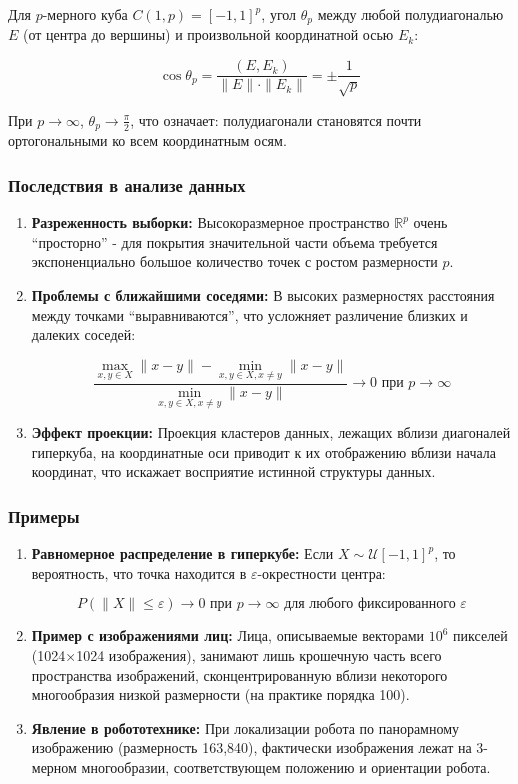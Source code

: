 \documentclass[a4paper,12pt]{article}
\begin{document}
Для $p$-мерного куба $C(1, p) = [-1, 1]^p$, угол $\theta_p$ между любой полудиагональю $E$ (от центра до вершины) и произвольной координатной осью $E_k$:
   
$$\cos\theta_p = \frac{(E, E_k)}{\|E\| \cdot \|E_k\|} = \pm\frac{1}{\sqrt{p}}$$
   
При $p \to \infty$, $\theta_p \to \frac{\pi}{2}$, что означает: полудиагонали становятся почти ортогональными ко всем координатным осям.

\subsubsection{Последствия в анализе данных}

\begin{enumerate}
    \item \textbf{Разреженность выборки:}
    Высокоразмерное пространство $\mathbb{R}^p$ очень ``просторно'' - для покрытия значительной части объема требуется экспоненциально большое количество точек с ростом размерности $p$.

    \item \textbf{Проблемы с ближайшими соседями:}
    В высоких размерностях расстояния между точками ``выравниваются'', что усложняет различение близких и далеких соседей:
    
    $$\frac{\max_{x,y \in X} \|x-y\| - \min_{x,y \in X, x \neq y} \|x-y\|}{\min_{x,y \in X, x \neq y} \|x-y\|} \to 0 \text{ при } p \to \infty$$

    \item \textbf{Эффект проекции:}
    Проекция кластеров данных, лежащих вблизи диагоналей гиперкуба, на координатные оси приводит к их отображению вблизи начала координат, что искажает восприятие истинной структуры данных.
\end{enumerate}

\subsubsection{Примеры}

\begin{enumerate}
    \item \textbf{Равномерное распределение в гиперкубе:}
    Если $X \sim \mathcal{U}[-1,1]^p$, то вероятность, что точка находится в $\varepsilon$-окрестности центра:
    
    $$P(\|X\| \leq \varepsilon) \to 0 \text{ при } p \to \infty \text{ для любого фиксированного } \varepsilon$$

    \item \textbf{Пример с изображениями лиц:}
    Лица, описываемые векторами $10^6$ пикселей (1024×1024 изображения), занимают лишь крошечную часть всего пространства изображений, сконцентрированную вблизи некоторого многообразия низкой размерности (на практике порядка 100).

    \item \textbf{Явление в робототехнике:}
    При локализации робота по панорамному изображению (размерность 163,840), фактически изображения лежат на 3-мерном многообразии, соответствующем положению и ориентации робота.
\end{enumerate}
\end{document}
